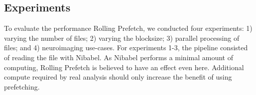 


\subsection{Experiments}
To evaluate the performance Rolling Prefetch, we conducted four experiments: 1) varying
the number of files; 2) varying the blocksize; 3) parallel processing of files;  and 4) neuroimaging use-cases.
For experiments 1-3, the pipeline consisted of reading the file with Nibabel. As Nibabel
performs a minimal amount of computing, Rolling Prefetch is believed to have an effect even here. Additional compute required
by real analysis should only increase the benefit of using prefetching.

